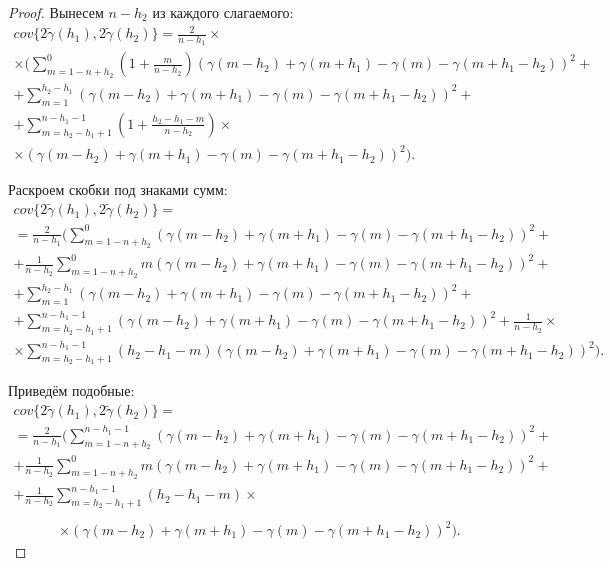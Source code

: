 \begin{proof}
Вынесем $ n - h_2 $ из каждого слагаемого:
\begin{equation*}\begin{gathered}
	cov\{ 2 \tilde{\gamma}(h_1), 2 \tilde{\gamma}(h_2) \} = \frac{2}{n - h_1} \times \\
	\times (\sum_{m = 1 - n + h_2}^{0} (1 + \frac{m}{n - h_2})(\gamma(m - h_2) + \gamma(m + h_1) - \gamma(m) - \gamma(m + h_1 - h_2))^2 + \\
	+ \sum_{m = 1}^{h_2 - h_1}(\gamma(m - h_2) + \gamma(m + h_1) - \gamma(m) - \gamma(m + h_1 - h_2))^2 + \\
	+ \sum_{m = h_2 - h_1 + 1}^{n - h_1 - 1}(1 + \frac{h_2 - h_1 - m}{n - h_2}) \times \\
	\times (\gamma(m - h_2) + \gamma(m + h_1) - \gamma(m) - \gamma(m + h_1 - h_2))^2).
\end{gathered}\end{equation*}

Раскроем скобки под знаками сумм:
\begin{equation*}\begin{gathered}
	cov\{ 2 \tilde{\gamma}(h_1), 2 \tilde{\gamma}(h_2) \} = \\
	= \frac{2}{n - h_1} (\sum_{m = 1 - n + h_2}^{0} (\gamma(m - h_2) + \gamma(m + h_1) - \gamma(m) - \gamma(m + h_1 - h_2))^2 + \\
	+ \frac{1}{n - h_2} \sum_{m = 1 - n + h_2}^{0} m (\gamma(m - h_2) + \gamma(m + h_1) - \gamma(m) - \gamma(m + h_1 - h_2))^2 + \\
	+ \sum_{m = 1}^{h_2 - h_1}(\gamma(m - h_2) + \gamma(m + h_1) - \gamma(m) - \gamma(m + h_1 - h_2))^2 + \\
	+ \sum_{m = h_2 - h_1 + 1}^{n - h_1 - 1}(\gamma(m - h_2) + \gamma(m + h_1) - \gamma(m) - \gamma(m + h_1 - h_2))^2 + \frac{1}{n - h_2} \times \\
	\times \sum_{m = h_2 - h_1 + 1}^{n - h_1 - 1} (h_2 - h_1 -m) (\gamma(m - h_2) + \gamma(m + h_1) - \gamma(m) - \gamma(m + h_1 - h_2))^2).
\end{gathered}\end{equation*}

Приведём подобные: %
\begin{equation*}\begin{gathered}
	cov\{ 2 \tilde{\gamma}(h_1), 2 \tilde{\gamma}(h_2) \} = \\
	= \frac{2}{n - h_1} (\sum_{m = 1 - n + h_2}^{n - h_1 - 1} (\gamma(m - h_2) + \gamma(m + h_1) - \gamma(m) - \gamma(m + h_1 - h_2))^2 + \\
	+ \frac{1}{n - h_2} \sum_{m = 1 - n + h_2}^{0} m (\gamma(m - h_2) + \gamma(m + h_1) - \gamma(m) - \gamma(m + h_1 - h_2))^2 + \\
	+ \frac{1}{n - h_2} \sum_{m = h_2 - h_1 + 1}^{n - h_1 - 1} (h_2 - h_1 - m) \times \\
\end{gathered}\end{equation*}
\begin{equation*}\begin{gathered}
	\times (\gamma(m - h_2) + \gamma(m + h_1) - \gamma(m) - \gamma(m + h_1 - h_2))^2).
\end{gathered}\end{equation*}


\end{proof}
